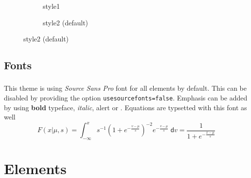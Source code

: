 \begin{frame}[fragile=singleslide]{\insertsectionhead}
\begin{figure}[ht!]
\begin{subfigure}[b]{0.3\textwidth}
      \caption*{style1}
    \end{subfigure}
    \hspace{\fill}
    \begin{subfigure}[b]{0.3\textwidth}
      \caption*{style2 (default)}
    \end{subfigure}
  \end{figure}
\end{frame}

\subsection{Fonts}

\begin{frame}
  \frametitle{\insertsectionhead}
  \framesubtitle{\insertsubsectionhead}
  This theme is using \textit{Source Sans Pro} font for all elements by default.
  This can be disabled by providing the option \texttt{usesourcefonts=false}.
  \vfill
  Emphasis can be added by using \textbf{bold} typeface, \textit{italic},
  \alert{alert} or {\color{tPrim}{simple colors}}.
  \vfill
  Equations are typsetted with this font as well
  \begin{equation*}
    F(x|\mu,s) = \int_{-\infty}^x s^{-1}\left(1+e^{-\frac{v-\mu}{s}}\right)^{-2} e^{-\frac{v-\mu}{s}}\;\mathsf{d}v = \frac{1}{1+e^{-\frac{x-\mu}{s}}}
  \end{equation*}
\end{frame}


\section{Elements}
